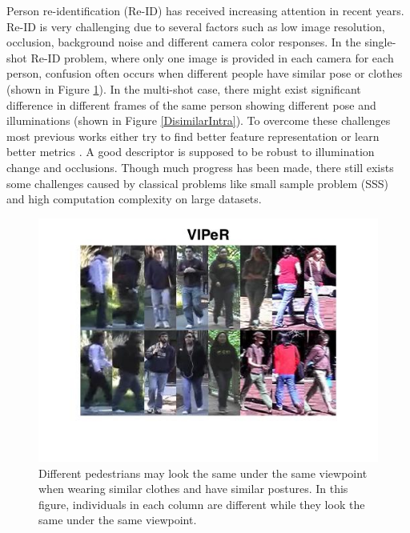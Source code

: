 \documentclass[10pt,twocolumn,letterpaper]{article}
\begin{document}
Person re-identification (Re-ID) has received increasing attention in recent years. Re-ID is very challenging due to several factors such as low image resolution, occlusion, background noise and different camera color responses. In the single-shot Re-ID problem, where only one image is provided in each camera for each person, confusion often occurs when different people have similar pose or clothes (shown in Figure \ref{fig::SimilarInterC}). In the multi-shot case, there might exist significant difference in different frames of the same person showing different pose and illuminations (shown in Figure \ref{DisimilarIntra}). To overcome these challenges most previous works either try to find better feature representation \cite{LOMO, GOG, RegionCovariance, SDALF} or learn better metrics \cite{KISSME, LFDA, PCCA, TDL, PRDC, LMNN, KLFDA, KCCA, KernelVersionMetrics, NFST, ITML}. A good descriptor is supposed to be robust to illumination change and occlusions. Though much progress has been made, there still exists some challenges caused by classical problems like small sample problem (SSS) and high computation complexity on large datasets.
\begin{figure} 
\centering
\includegraphics[width=0.8\linewidth]{SimilarInter.jpg}
\vspace{-2em}
\caption{Different pedestrians may look the same under the same viewpoint when wearing similar clothes and have similar postures. In this figure, individuals in each column are different while they look the same under the same viewpoint.}
\label{fig::SimilarInterC}

\end{figure}
\end{document}
